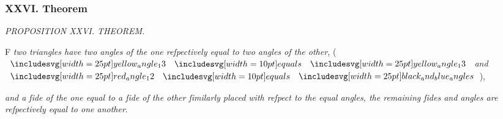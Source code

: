 \documentclass[11pt,preview]{standalone}
\begin{document}
\subsubsection{XXVI. Theorem}

\begin{minipage}{0.43\textwidth}
    \phantom{}
\end{minipage}%
\hfill
\begin{minipage}[t]{0.55\textwidth}

    \begin{center}
        \textit{PROPOSITION XXVI. THEOREM.}\label{book1pr26} \\
    \end{center}

    \hfill

    \begin{center}
        \raggedright \lettrine[lines=3, loversize=1, nindent=0pt]{}{}F \textit{two triangles have two angles of the one reſpectively equal to two angles of the other,} (\hspace{-1ex}$\img{yellow_angle_13} \bequals \img{yellow_angle_13}$ \textit{and} $\img{red_angle_12} \bequals \img{black_and_blue_angles}$\hspace{-1ex}),
    \end{center}
    \vspace{1ex}
    \textit{and a ſide of the one equal to a ſide of the other ſimilarly placed with reſpect to the equal angles, the remaining ſides and angles are reſpectively equal to one another}.

\end{minipage}%

\hfill
\end{document}
